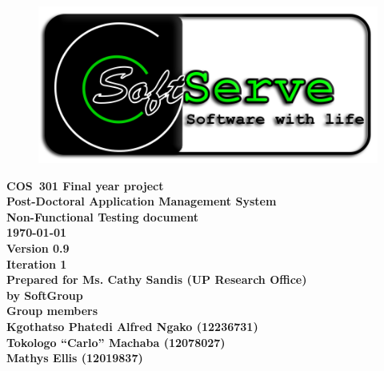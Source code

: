 \documentclass[12pt]{article}
\newcommand{\Title}{Non-Functional Testing document} %
\newcommand{\Class}{COS\ 301 Final year project} %
\newcommand{\ssr}{Soft\color{green}{Serve }\color{black}}
\newcommand{\version}{0.9}
\newcommand{\iteration}{1}
\newcommand{\client}{Ms. Cathy Sandis (UP Research Office)}
\newcommand{\project}{Post-Doctoral Application Management System}
\begin{document}
\vspace{4em}

\begin{center}%

\begin{figure}[ht!]
\centering
\includegraphics{../Images_Docs/logo.png}
\end{figure}
\LARGE \bf \Class \\[0.25em]
\LARGE \bf \project \\[1em]
\LARGE \bf \Title \\[0.25em]
\large \bf \today\\
\bf Version \version\\
\bf Iteration \iteration\\[0.5em]
\Large \bf Prepared for \client\\
\Large \bf by
\Large {\bf \ssr Group }\\[0.5em]
\LARGE {\bf Group members}\\[0.25em]
\large
Kgothatso Phatedi Alfred Ngako (12236731) \\[0.5em]
Tokologo “Carlo” Machaba (12078027) \\[0.5em]
Mathys Ellis (12019837) \\[8em]

\end{center}%

\end{document}
